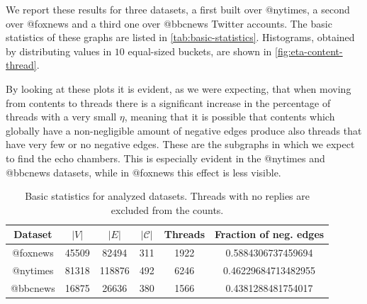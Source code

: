 We report these results for
three datasets, a first built over @nytimes, a second over @foxnews
and a third one over @bbcnews Twitter accounts\footnotemark. The basic
statistics of these graphs are listed in \autoref{tab:basic-statistics}. Histograms, obtained
by distributing values in $10$ equal-sized buckets, are shown in \autoref{fig:eta-content-thread}.


By looking at these plots it is evident, as we were expecting, that when
moving from
contents to threads there is a significant increase in the percentage of
threads with a very small $\eta$, meaning that it is possible that contents which
globally have
a non-negligible amount of negative edges produce also threads that have
very few or no negative edges. These are the subgraphs in which we expect to
find the echo chambers. This is especially evident in the @nytimes and @bbcnews
datasets, while in @foxnews this effect is less visible.

\begin{table}
	\centering
	\caption{Basic statistics for analyzed datasets. Threads with no replies
		are excluded from the counts.}
	\label{tab:basic-statistics}
	\begin{tabular}{|c c c c c c|}
		\toprule
		Dataset  & $|V|$ & $|E|$  & $|\mathcal{C} |$ & Threads & Fraction of
		neg. edges                                                                         \\
		\midrule
		@foxnews & 45509 & 82494  & 311              & 1922    & \num{0.5884306737459694}  \\
		@nytimes & 81318 & 118876 & 492              & 6246    & \num{0.46229684713482955} \\
		@bbcnews & 16875 & 26636  & 380              & 1566    & \num{0.4381288481754017}  \\
		\bottomrule
	\end{tabular}
\end{table}

